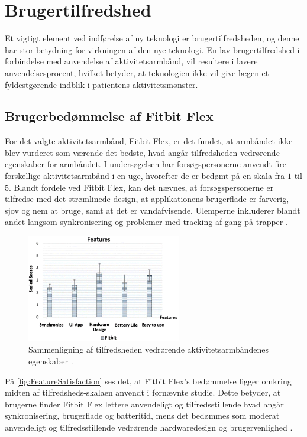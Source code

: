 \section{Brugertilfredshed}

Et vigtigt element ved indførelse af ny teknologi er brugertilfredsheden, og denne har stor betydning for virkningen af den nye teknologi. En lav brugertilfredshed i forbindelse med anvendelse af aktivitetsarmbånd, vil resultere i lavere anvendelsesprocent, hvilket betyder, at teknologien ikke vil give lægen et fyldestgørende indblik i patientens aktivitetsmønster.

\subsection{Brugerbedømmelse af Fitbit Flex} \label{sec:brugerbedommelse}

For det valgte aktivitetsarmbånd, Fitbit Flex, er det fundet, at armbåndet ikke blev vurderet som værende det bedste, hvad angår tilfredsheden vedrørende egenskaber for armbåndet. I undersøgelsen  har forsøgspersonerne anvendt fire forskellige aktivitetsarmbånd i en uge, hvorefter de er bedømt på en skala fra $1$ til $5$. Blandt fordele ved Fitbit Flex, kan det nævnes, at forsøgspersonerne er tilfredse med det strømlinede design, at applikationens brugerflade er farverig, sjov og nem at bruge, samt at det er vandafvisende. Ulemperne inkluderer blandt andet langsom synkronisering og problemer med tracking af gang på trapper \citep{kaewkannate2016}.

\begin{figure}[H]
	\centering
	\includegraphics[width=0.6\textwidth]{figures/FeatureSatisfaction2}
	\caption{Sammenligning af tilfredsheden vedrørende aktivitetsarmbåndenes egenskaber \citep{kaewkannate2016}.}
	\label{fig:FeatureSatisfaction}
\end{figure}

\noindent
På \autoref{fig:FeatureSatisfaction} ses det, at Fitbit Flex's bedømmelse ligger omkring midten af tilfredsheds-skalaen anvendt i førnævnte studie. Dette betyder, at brugerne finder Fitbit Flex lettere anvendeligt og tilfredsstillende hvad angår synkronisering, brugerflade og batteritid, mens det bedømmes som moderat anvendeligt og tilfredsstillende vedrørende hardwaredesign og brugervenlighed \citep{kaewkannate2016}.

